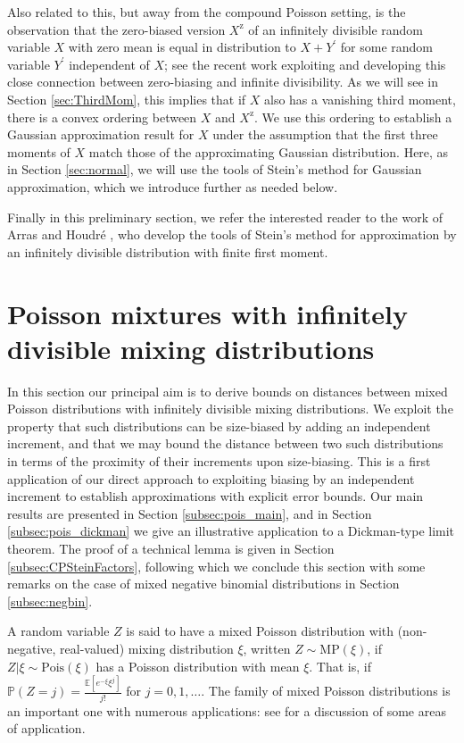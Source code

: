 \documentclass[12pt]{article}
\begin{document}
Also related to this, but away from the compound Poisson setting, is the observation that the zero-biased version $X^\text{z}$ of an infinitely divisible random variable $X$ with zero mean is equal in distribution to $X+Y^\prime$ for some random variable $Y^\prime$ independent of $X$; see the recent work \cite{goldstein24} exploiting and developing this close connection between zero-biasing and infinite divisibility. As we will see in Section \ref{sec:ThirdMom}, this implies that if $X$ also has a vanishing third moment, there is a convex ordering between $X$ and $X^\text{z}$. We use this ordering to establish a Gaussian approximation result for $X$ under the assumption that the first three moments of $X$ match those of the approximating Gaussian distribution. Here, as in Section \ref{sec:normal}, we will use the tools of Stein's method for Gaussian approximation, which we introduce further as needed below.

Finally in this preliminary section, we refer the interested reader to the work of Arras and Houdr\'e \cite{arras19}, who develop the tools of Stein's method for approximation by an infinitely divisible distribution with finite first moment.

\section{Poisson mixtures with infinitely divisible mixing distributions}\label{sec:pois}

In this section our principal aim is to derive bounds on distances between mixed Poisson distributions with infinitely divisible mixing distributions. We exploit the property that such distributions can be size-biased by adding an independent increment, and that we may bound the distance between two such distributions in terms of the proximity of their increments upon size-biasing. This is a first application of our direct approach to exploiting biasing by an independent increment to establish approximations with explicit error bounds. Our main results are presented in Section \ref{subsec:pois_main}, and in Section \ref{subsec:pois_dickman} we give an illustrative application to a Dickman-type limit theorem. The proof of a technical lemma is given in Section \ref{subsec:CPSteinFactors}, following which we conclude this section with some remarks on the case of mixed negative binomial distributions in Section \ref{subsec:negbin}. 

A random variable $Z$ is said to have a mixed Poisson distribution with (non-negative, real-valued) mixing distribution $\xi$, written $Z\sim\text{MP}(\xi)$, if $Z|\xi\sim\mbox{Pois}(\xi)$ has a Poisson distribution with mean $\xi$. That is, if $\mathbb{P}(Z=j)=\frac{\mathbb{E}[e^{-\xi}\xi^j]}{j!}$ for $j=0,1,\ldots$. The family of mixed Poisson distributions is an important one with numerous applications: see \cite{karlis05} for a discussion of some areas of application.
\end{document}
